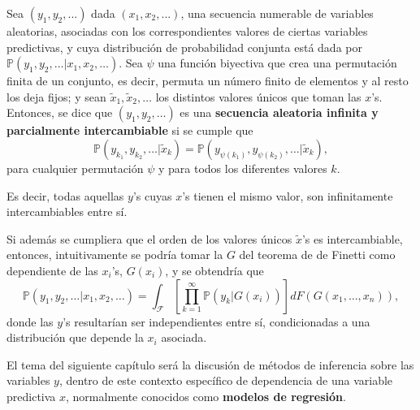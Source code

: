 \begin{defin*}
    Sea $(y_1,y_2,...)$ dada $(x_1,x_2,...)$, una secuencia numerable de variables aleatorias, asociadas con los correspondientes valores de ciertas variables predictivas, y cuya distribuci\'on de probabilidad conjunta est\'a dada por $\mathbb{P}(y_1,y_2,\ldots|x_1,x_2,\ldots)$. Sea $\psi$ una funci\'on biyectiva que crea una permutaci\'on finita de un conjunto, es decir, permuta un n\'umero finito de elementos y al resto los deja fijos; y sean $\tilde{x}_1,\tilde{x}_2,\ldots$ los distintos valores \'unicos que toman las $x$'s.  
    Entonces, se dice que $(y_1,y_2,\ldots)$ es una \textbf{secuencia aleatoria infinita y parcialmente intercambiable} si se cumple que 
    \begin{equation*}
        \mathbb{P}(y_{k_1},y_{k_2},\ldots|\tilde{x}_k) = \mathbb{P}(y_{\psi(k_1)},y_{\psi(k_2)},\ldots|\tilde{x}_k),
    \end{equation*}
    para cualquier permutaci\'on $\psi$ y para todos los diferentes valores $k$.
    
    Es decir, todas aquellas $y$'s cuyas $x$'s tienen el mismo valor, son infinitamente intercambiables entre s\'i. 
\end{defin*}

Si adem\'as se cumpliera que el orden de los valores \'unicos $\tilde{x}$'s es intercambiable, entonces, intuitivamente se podr\'ia tomar la $G$ del teorema de de Finetti como dependiente de las $x_i$'s, $G(x_i)$, y se obtendr\'ia que
\begin{equation*}
    \mathbb{P}(y_1,y_2,\ldots|x_1,x_2,\ldots) =
    \int_{\mathcal{F}}\left[\prod_{k=1}^\infty \mathbb{P}(y_k|G(x_i))\right]dF(G(x_1,\ldots,x_n)),
\end{equation*}
donde las $y$'s resultar\'ian ser independientes entre s\'i, condicionadas a una distribuci\'on que depende la $x_i$ asociada.

El tema del siguiente cap\'itulo ser\'a la discusi\'on de m\'etodos de inferencia sobre las variables $y$, dentro de este contexto espec\'ifico de dependencia de una variable predictiva $x$, normalmente conocidos como \textbf{modelos de regresi\'on}.

\newpage
